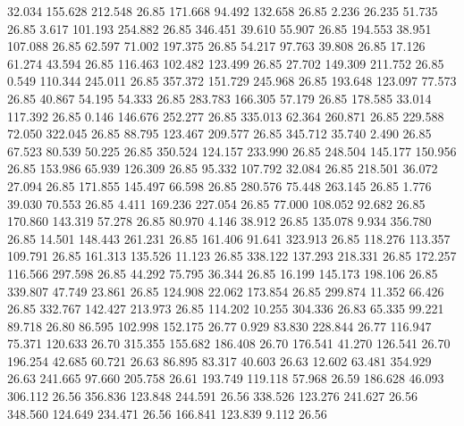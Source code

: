   32.034  155.628  212.548        26.85
 171.668   94.492  132.658        26.85
   2.236   26.235   51.735        26.85
   3.617  101.193  254.882        26.85
 346.451   39.610   55.907        26.85
 194.553   38.951  107.088        26.85
  62.597   71.002  197.375        26.85
  54.217   97.763   39.808        26.85
  17.126   61.274   43.594        26.85
 116.463  102.482  123.499        26.85
  27.702  149.309  211.752        26.85
   0.549  110.344  245.011        26.85
 357.372  151.729  245.968        26.85
 193.648  123.097   77.573        26.85
  40.867   54.195   54.333        26.85
 283.783  166.305   57.179        26.85
 178.585   33.014  117.392        26.85
   0.146  146.676  252.277        26.85
 335.013   62.364  260.871        26.85
 229.588   72.050  322.045        26.85
  88.795  123.467  209.577        26.85
 345.712   35.740    2.490        26.85
  67.523   80.539   50.225        26.85
 350.524  124.157  233.990        26.85
 248.504  145.177  150.956        26.85
 153.986   65.939  126.309        26.85
  95.332  107.792   32.084        26.85
 218.501   36.072   27.094        26.85
 171.855  145.497   66.598        26.85
 280.576   75.448  263.145        26.85
   1.776   39.030   70.553        26.85
   4.411  169.236  227.054        26.85
  77.000  108.052   92.682        26.85
 170.860  143.319   57.278        26.85
  80.970    4.146   38.912        26.85
 135.078    9.934  356.780        26.85
  14.501  148.443  261.231        26.85
 161.406   91.641  323.913        26.85
 118.276  113.357  109.791        26.85
 161.313  135.526   11.123        26.85
 338.122  137.293  218.331        26.85
 172.257  116.566  297.598        26.85
  44.292   75.795   36.344        26.85
  16.199  145.173  198.106        26.85
 339.807   47.749   23.861        26.85
 124.908   22.062  173.854        26.85
 299.874   11.352   66.426        26.85
 332.767  142.427  213.973        26.85
 114.202   10.255  304.336        26.83
  65.335   99.221   89.718        26.80
  86.595  102.998  152.175        26.77
   0.929   83.830  228.844        26.77
 116.947   75.371  120.633        26.70
 315.355  155.682  186.408        26.70
 176.541   41.270  126.541        26.70
 196.254   42.685   60.721        26.63
  86.895   83.317   40.603        26.63
  12.602   63.481  354.929        26.63
 241.665   97.660  205.758        26.61
 193.749  119.118   57.968        26.59
 186.628   46.093  306.112        26.56
 356.836  123.848  244.591        26.56
 338.526  123.276  241.627        26.56
 348.560  124.649  234.471        26.56
 166.841  123.839    9.112        26.56
